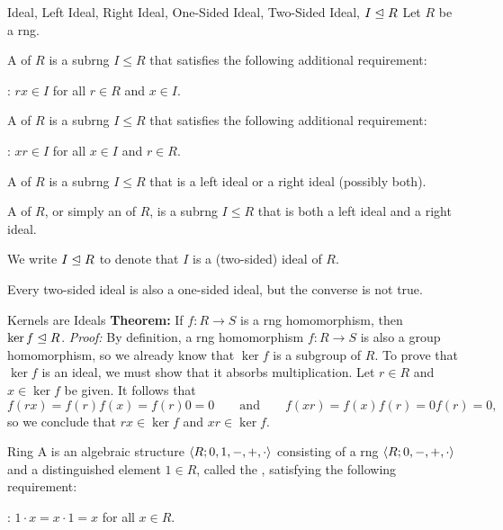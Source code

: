 \documentclass[12pt]{report}
\begin{document}
\begin{dfnbox}{Ideal, Left Ideal, Right Ideal, One-Sided Ideal, Two-Sided Ideal, $I \trianglelefteq R$}
	Let $R$ be a rng.
	\begin{dfnitems}
		\item A  of $R$ is a subrng $I \le R$ that satisfies the following additional requirement:
		\begin{dfnitems}
			\item {}: $rx \in I$ for all $r \in R$ and $x \in I$.
		\end{dfnitems}
		\item A  of $R$ is a subrng $I \le R$ that satisfies the following additional requirement:
		\begin{dfnitems}
			\item {}: $xr \in I$ for all $x \in I$ and $r \in R$.
		\end{dfnitems}
		\item A  of $R$ is a subrng $I \le R$ that is a left ideal or a right ideal (possibly both).
		\item A  of $R$, or simply an  of $R$, is a subrng $I \le R$ that is both a left ideal and a right ideal.
	\end{dfnitems}
	We write $I \trianglelefteq R$ to denote that $I$ is a (two-sided) ideal of $R$.
\end{dfnbox}

Every two-sided ideal is also a one-sided ideal, but the converse is not true.

\begin{thmbox}{Kernels are Ideals}
	\textbf{Theorem:} If $f: R \to S$ is a rng homomorphism, then $\ker f \trianglelefteq R$.
\tcblower
	\textit{Proof:} By definition, a rng homomorphism $f: R \to S$ is also a group homomorphism, so we already know that $\ker f$ is a subgroup of $R$. To prove that $\ker f$ is an ideal, we must show that it absorbs multiplication. Let $r \in R$ and $x \in \ker f$ be given. It follows that
	\[ f(rx) = f(r)f(x) = f(r)0 = 0
	\qquad \text{and} \qquad
	f(xr) = f(x)f(r) = 0f(r) = 0, \]
	so we conclude that $rx \in \ker f$ and $xr \in \ker f$.
\end{thmbox}

\begin{dfnbox}{Ring}
	A  is an algebraic structure ${\langle {R; 0, 1, -, +, \cdot} \rangle}$ consisting of a rng ${\langle {R; 0, -, +, \cdot} \rangle}$ and a distinguished element $1 \in R$, called the , satisfying the following requirement:
	\begin{dfnitems}
		\item {}: $1 \cdot x = x \cdot 1 = x$ for all $x \in R$.
	\end{dfnitems}
\end{dfnbox}
\end{document}
